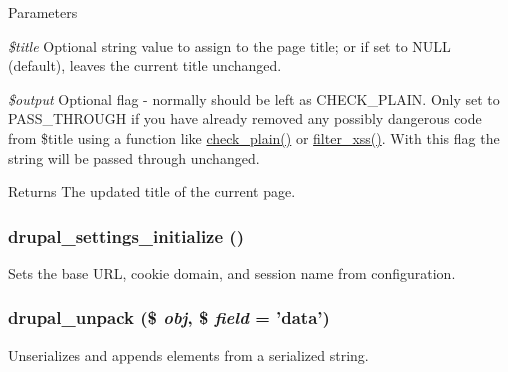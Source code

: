 \begin{DoxyParams}{Parameters}
\item[{\em \$title}]Optional string value to assign to the page title; or if set to NULL (default), leaves the current title unchanged. \item[{\em \$output}]Optional flag -\/ normally should be left as CHECK\_\-PLAIN. Only set to PASS\_\-THROUGH if you have already removed any possibly dangerous code from \$title using a function like \hyperlink{group__sanitization_ga76fc67a30fd8d75ddd80565e6e65a13d}{check\_\-plain()} or \hyperlink{group__sanitization_ga8864a29ffa8de5c9f8dc9e417060660d}{filter\_\-xss()}. With this flag the string will be passed through unchanged.\end{DoxyParams}
\begin{DoxyReturn}{Returns}
The updated title of the current page. 
\end{DoxyReturn}
\hypertarget{bootstrap_8inc_acae9a8501a2571219d7517f50cc6afec}{
\subsubsection[{drupal\_\-settings\_\-initialize}]{\setlength{\rightskip}{0pt plus 5cm}drupal\_\-settings\_\-initialize ()}}
\label{bootstrap_8inc_acae9a8501a2571219d7517f50cc6afec}
Sets the base URL, cookie domain, and session name from configuration. \hypertarget{bootstrap_8inc_a4ca39fd7bed1a45e340f86bc2d59224d}{
\subsubsection[{drupal\_\-unpack}]{\setlength{\rightskip}{0pt plus 5cm}drupal\_\-unpack (\$ {\em obj}, \/  \$ {\em field} = {\ttfamily 'data'})}}
\label{bootstrap_8inc_a4ca39fd7bed1a45e340f86bc2d59224d}
Unserializes and appends elements from a serialized string.


